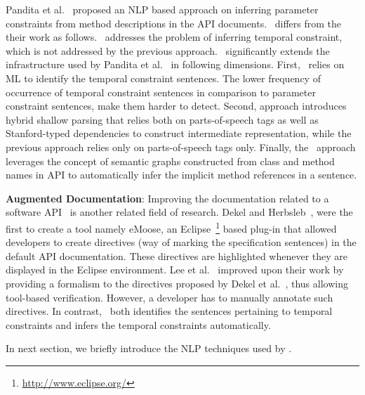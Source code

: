 Pandita et al.~\cite{pandita12:inferring} proposed an NLP based approach on inferring parameter constraints from method descriptions in the API documents. \tool\ differs from the their work as follows.
\tool\ addresses the problem of inferring temporal constraint, which is not addressed by the previous approach. \tool\ significantly extends the infrastructure used by Pandita et al.~\cite{pandita12:inferring} in following dimensions.
First, \tool\ relies on ML to identify the temporal constraint sentences. The lower frequency of occurrence of temporal constraint sentences in comparison to parameter constraint sentences, make them harder to detect.
Second, approach introduces hybrid shallow parsing that relies both on parts-of-speech tags as well as Stanford-typed dependencies to construct intermediate representation, while the previous approach relies only on parts-of-speech tags only.
Finally, the \tool\ approach leverages the concept of semantic graphs constructed from class and method names in API to automatically infer the implicit method references in a sentence.  


\textbf{Augmented Documentation}:
Improving the documentation related to a software API~\cite{Dekel2009,tan2011acomment} is another related field of research.
Dekel and Herbsleb~\cite{Dekel2009}, were the first to create a tool namely eMoose,
an Eclipse~\footnote{\url{http://www.eclipse.org/}} based plug-in that allowed developers to create directives
(way of marking the specification sentences) in the default API documentation.
These directives are highlighted whenever they are displayed in the Eclipse environment.
Lee et al.~\cite{lee2012towards} improved upon their work by providing a formalism to the directives proposed by Dekel et al.~\cite{Dekel2009},
thus allowing tool-based verification.
However, a developer has to manually annotate such directives.
In contrast, \tool\ both identifies the sentences pertaining to temporal constraints and infers the temporal constraints automatically. 

In next section, we briefly introduce the NLP techniques used by \tool.